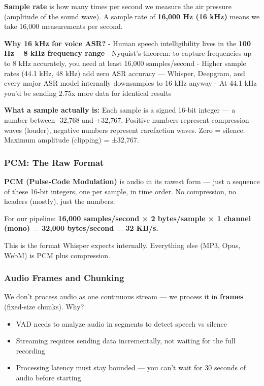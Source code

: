 \documentclass[
  11pt,
]{article}
\providecommand{\tightlist}{%
  \setlength{\itemsep}{0pt}\setlength{\parskip}{0pt}}
\begin{document}
\textbf{Sample rate} is how many times per second we measure the air
pressure (amplitude of the sound wave). A sample rate of \textbf{16,000
Hz (16 kHz)} means we take 16,000 measurements per second.

\textbf{Why 16 kHz for voice ASR?} - Human speech intelligibility lives
in the \textbf{100 Hz -- 8 kHz frequency range} - Nyquist's theorem: to
capture frequencies up to 8 kHz accurately, you need at least 16,000
samples/second - Higher sample rates (44.1 kHz, 48 kHz) add zero ASR
accuracy --- Whisper, Deepgram, and every major ASR model internally
downsamples to 16 kHz anyway - At 44.1 kHz you'd be sending 2.75x more
data for identical results

\textbf{What a sample actually is:} Each sample is a signed 16-bit
integer --- a number between -32,768 and +32,767. Positive numbers
represent compression waves (louder), negative numbers represent
rarefaction waves. Zero = silence. Maximum amplitude (clipping) =
±32,767.

\hypertarget{pcm-the-raw-format}{%
\subsubsection{PCM: The Raw Format}\label{pcm-the-raw-format}}

\textbf{PCM (Pulse-Code Modulation)} is audio in its rawest form ---
just a sequence of these 16-bit integers, one per sample, in time order.
No compression, no headers (mostly), just the numbers.

For our pipeline: \textbf{16,000 samples/second × 2 bytes/sample × 1
channel (mono) = 32,000 bytes/second = 32 KB/s.}

This is the format Whisper expects internally. Everything else (MP3,
Opus, WebM) is PCM plus compression.

\hypertarget{audio-frames-and-chunking}{%
\subsubsection{Audio Frames and
Chunking}\label{audio-frames-and-chunking}}

We don't process audio as one continuous stream --- we process it in
\textbf{frames} (fixed-size chunks). Why?

\begin{itemize}
\tightlist
\item
  VAD needs to analyze audio in segments to detect speech vs silence
\item
  Streaming requires sending data incrementally, not waiting for the
  full recording
\item
  Processing latency must stay bounded --- you can't wait for 30 seconds
  of audio before starting
\end{itemize}
\end{document}
